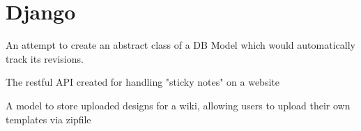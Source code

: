 \section{Django}

{An attempt to create an abstract class of a DB Model which would automatically track its revisions.}

{The restful API created for handling "sticky notes" on a website}

{A model to store uploaded designs for a wiki, allowing users to upload their own templates via zipfile}
